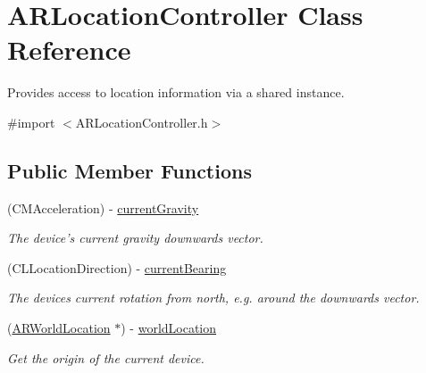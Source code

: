 \hypertarget{interface_a_r_location_controller}{\section{A\-R\-Location\-Controller Class Reference}
\label{interface_a_r_location_controller}
}


Provides access to location information via a shared instance.  




{\ttfamily \#import $<$A\-R\-Location\-Controller.\-h$>$}

\subsection*{Public Member Functions}
\begin{DoxyCompactItemize}
\item 
\hypertarget{interface_a_r_location_controller_aece737bf9997135b189c20d21e987afc}{(C\-M\-Acceleration) -\/ \hyperlink{interface_a_r_location_controller_aece737bf9997135b189c20d21e987afc}{current\-Gravity}}\label{interface_a_r_location_controller_aece737bf9997135b189c20d21e987afc}

\begin{DoxyCompactList}\small\item\em The device's current gravity downwards vector. \end{DoxyCompactList}\item 
\hypertarget{interface_a_r_location_controller_af59323af0761354ffe3b3f7a8f2a04c7}{(C\-L\-Location\-Direction) -\/ \hyperlink{interface_a_r_location_controller_af59323af0761354ffe3b3f7a8f2a04c7}{current\-Bearing}}\label{interface_a_r_location_controller_af59323af0761354ffe3b3f7a8f2a04c7}

\begin{DoxyCompactList}\small\item\em The devices current rotation from north, e.\-g. around the downwards vector. \end{DoxyCompactList}\item 
\hypertarget{interface_a_r_location_controller_add343901133f310b9a56d66f89cf5a6a}{(\hyperlink{interface_a_r_world_location}{A\-R\-World\-Location} $\ast$) -\/ \hyperlink{interface_a_r_location_controller_add343901133f310b9a56d66f89cf5a6a}{world\-Location}}\label{interface_a_r_location_controller_add343901133f310b9a56d66f89cf5a6a}

\begin{DoxyCompactList}\small\item\em Get the origin of the current device. \end{DoxyCompactList}\end{DoxyCompactItemize}
